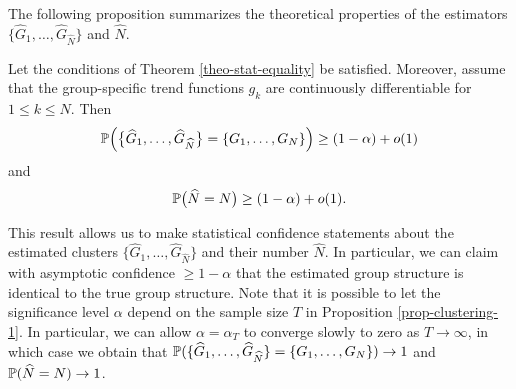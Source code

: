 \documentclass[a4paper,12pt]{article}
\numberwithin{equation}{section}
\begin{document}
The following proposition summarizes the theoretical properties of the estimators $\{ \widehat{G}_1,\ldots,\widehat{G}_{\widehat{N}} \}$ and $\widehat{N}$. 
\begin{prop}\label{prop-clustering-1}
Let the conditions of Theorem \ref{theo-stat-equality} be satisfied. Moreover, assume that the group-specific trend functions $g_k$ are continuously differentiable for $1 \le k \le N$. Then 
\[ \mathbb{P} \Big( \big\{ \widehat{G}_1,\ldots,\widehat{G}_{\widehat{N}} \big\} = \{ G_1,\ldots,G_N \} \Big) \ge (1-\alpha) + o(1) \]
and 
\[ \mathbb{P} \big( \widehat{N} = N \big) \ge (1-\alpha) + o(1). \]
\end{prop}
This result allows us to make statistical confidence statements about the estimated clusters $\{ \widehat{G}_1,\ldots,\widehat{G}_{\widehat{N}} \}$ and their number $\widehat{N}$. In particular, we can claim with asymptotic confidence $\ge 1 - \alpha$ that the estimated group structure is identical to the true group structure. Note that it is possible to let the significance level $\alpha$ depend on the sample size $T$ in Proposition \ref{prop-clustering-1}. In particular, we can allow $\alpha = \alpha_T$ to converge slowly to zero as $T \rightarrow \infty$, in which case we obtain that $\mathbb{P} ( \{ \widehat{G}_1,\ldots,\widehat{G}_{\widehat{N}} \} = \{ G_1,\ldots,G_N \} ) \rightarrow 1$ and $\mathbb{P} ( \widehat{N} = N ) \rightarrow 1$.    
\end{document}

